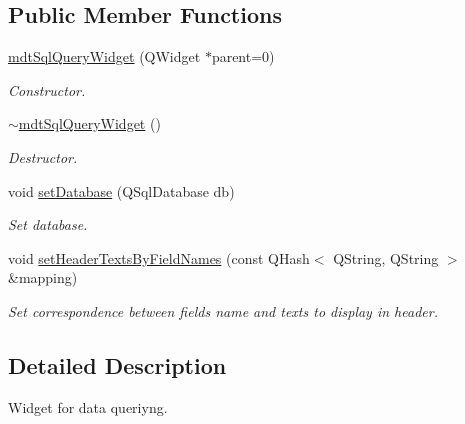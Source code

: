 \subsection*{Public Member Functions}
\begin{DoxyCompactItemize}
\item 
\hypertarget{classmdt_sql_query_widget_a164c6ea31fd4499109c6422f7a8f2bdf}{
\hyperlink{classmdt_sql_query_widget_a164c6ea31fd4499109c6422f7a8f2bdf}{mdtSqlQueryWidget} (QWidget $\ast$parent=0)}
\label{classmdt_sql_query_widget_a164c6ea31fd4499109c6422f7a8f2bdf}

\begin{DoxyCompactList}\small\item\em Constructor. \end{DoxyCompactList}\item 
\hypertarget{classmdt_sql_query_widget_a03a4c8f444655f35d91b1a1b58a13b85}{
\hyperlink{classmdt_sql_query_widget_a03a4c8f444655f35d91b1a1b58a13b85}{$\sim$mdtSqlQueryWidget} ()}
\label{classmdt_sql_query_widget_a03a4c8f444655f35d91b1a1b58a13b85}

\begin{DoxyCompactList}\small\item\em Destructor. \end{DoxyCompactList}\item 
\hypertarget{classmdt_sql_query_widget_a69de231c33149a9f01df0215a91cf0bd}{
void \hyperlink{classmdt_sql_query_widget_a69de231c33149a9f01df0215a91cf0bd}{setDatabase} (QSqlDatabase db)}
\label{classmdt_sql_query_widget_a69de231c33149a9f01df0215a91cf0bd}

\begin{DoxyCompactList}\small\item\em Set database. \end{DoxyCompactList}\item 
void \hyperlink{classmdt_sql_query_widget_a8ca0e1fbf8be78fe178ee1f2fc15522c}{setHeaderTextsByFieldNames} (const QHash$<$ QString, QString $>$ \&mapping)
\begin{DoxyCompactList}\small\item\em Set correspondence between fields name and texts to display in header. \end{DoxyCompactList}\end{DoxyCompactItemize}


\subsection{Detailed Description}
Widget for data queriyng. 

